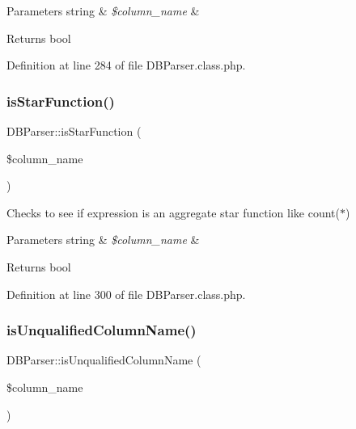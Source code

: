 \begin{DoxyParams}[1]{Parameters}
string & {\em \$column\+\_\+name} & \\
\hline
\end{DoxyParams}
\begin{DoxyReturn}{Returns}
bool 
\end{DoxyReturn}


Definition at line 284 of file D\+B\+Parser.\+class.\+php.

\mbox{\label{classDBParser_a6a13c1cc9497af7dd0cb48e07b852947}} 
\subsubsection{\texorpdfstring{is\+Star\+Function()}{isStarFunction()}}
{\footnotesize\ttfamily D\+B\+Parser\+::is\+Star\+Function (\begin{DoxyParamCaption}\item[{}]{\$column\+\_\+name }\end{DoxyParamCaption})}

Checks to see if expression is an aggregate star function like count($\ast$)


\begin{DoxyParams}[1]{Parameters}
string & {\em \$column\+\_\+name} & \\
\hline
\end{DoxyParams}
\begin{DoxyReturn}{Returns}
bool 
\end{DoxyReturn}


Definition at line 300 of file D\+B\+Parser.\+class.\+php.

\mbox{\label{classDBParser_a049f95bd692b0d34a72f88f92091af6f}} 
\subsubsection{\texorpdfstring{is\+Unqualified\+Column\+Name()}{isUnqualifiedColumnName()}}
{\footnotesize\ttfamily D\+B\+Parser\+::is\+Unqualified\+Column\+Name (\begin{DoxyParamCaption}\item[{}]{\$column\+\_\+name }\end{DoxyParamCaption})}

